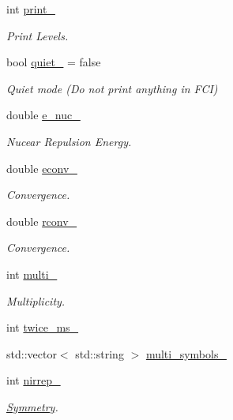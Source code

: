 \begin{DoxyCompactItemize}
int \mbox{\hyperlink{classforte_1_1_f_c_i___m_o_a0f0d63de851bcf9802ed3fb0bced1734}{print\+\_\+}}
\begin{DoxyCompactList}\small\item\em Print Levels. \end{DoxyCompactList}\item 
bool \mbox{\hyperlink{classforte_1_1_f_c_i___m_o_a4d0c5fb5d5d847024a7921ddc937cf2a}{quiet\+\_\+}} = false
\begin{DoxyCompactList}\small\item\em Quiet mode (Do not print anything in F\+CI) \end{DoxyCompactList}\item 
double \mbox{\hyperlink{classforte_1_1_f_c_i___m_o_ac62d801b09b6476c51aedb15ab4c3e9d}{e\+\_\+nuc\+\_\+}}
\begin{DoxyCompactList}\small\item\em Nucear Repulsion Energy. \end{DoxyCompactList}\item 
double \mbox{\hyperlink{classforte_1_1_f_c_i___m_o_abc0f5b82d716d99fa2b8c45fcba27d44}{econv\+\_\+}}
\begin{DoxyCompactList}\small\item\em Convergence. \end{DoxyCompactList}\item 
double \mbox{\hyperlink{classforte_1_1_f_c_i___m_o_adf70de3fc137b80aaffe1256b5562fad}{rconv\+\_\+}}
\begin{DoxyCompactList}\small\item\em Convergence. \end{DoxyCompactList}\item 
int \mbox{\hyperlink{classforte_1_1_f_c_i___m_o_a6e125ab9557be72444e3ca4ebf2c5939}{multi\+\_\+}}
\begin{DoxyCompactList}\small\item\em Multiplicity. \end{DoxyCompactList}\item 
int \mbox{\hyperlink{classforte_1_1_f_c_i___m_o_af00af228348648a018fb687ec1cb0acd}{twice\+\_\+ms\+\_\+}}
\item 
std\+::vector$<$ std\+::string $>$ \mbox{\hyperlink{classforte_1_1_f_c_i___m_o_aaa272f595b279c7c4371a7ec522f535b}{multi\+\_\+symbols\+\_\+}}
\item 
int \mbox{\hyperlink{classforte_1_1_f_c_i___m_o_ac81398df5e9a4db4f843087ff7acffd7}{nirrep\+\_\+}}
\begin{DoxyCompactList}\small\item\em \mbox{\hyperlink{classforte_1_1_symmetry}{Symmetry}}. \end{DoxyCompactList}\item 

\end{DoxyCompactItemize}

